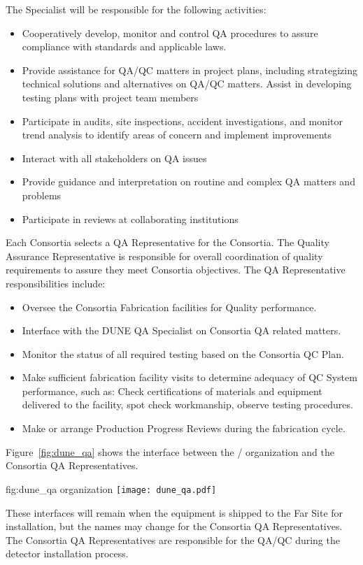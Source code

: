The  Specialist will be responsible for the
following activities:
\begin{itemize}
	\item Cooperatively develop, monitor and control 
          QA procedures to assure compliance with 
          standards and applicable laws.
     \item Provide assistance for QA/QC matters in project plans,
       including strategizing technical solutions and alternatives on
       QA/QC matters.  Assist in developing testing plans with project
       team members
	   \item Participate in audits, site inspections, accident
             investigations, and monitor trend analysis to identify
             areas of concern and implement improvements
	\item Interact with all stakeholders on QA issues
      \item Provide guidance and interpretation on routine and complex
        QA matters and problems
	\item Participate in reviews at collaborating
          institutions
\end{itemize}

Each Consortia selects a QA Representative for the Consortia.  The
Quality Assurance Representative is responsible for overall
coordination of quality requirements to assure they meet Consortia
objectives.  The QA Representative responsibilities include:
\begin{itemize}
  \item Oversee the Consortia Fabrication facilities for Quality
    performance.
  \item Interface with the DUNE QA Specialist on Consortia QA related
    matters.
  \item Monitor the status of all required testing based on the
    Consortia QC Plan.
  \item Make sufficient fabrication facility visits to determine
    adequacy of QC System performance, such as: Check certifications
    of materials and equipment delivered to the facility, spot check
    workmanship, observe testing procedures.
  \item Make or arrange Production Progress Reviews during the
    fabrication cycle.
\end{itemize}

Figure~\ref{fig:dune_qa} shows the interface between the
/  organization and the Consortia QA
Representatives.
\begin{dunefigure}{fig:dune_qa}
  { organization}
  \texttt{[image: dune\_qa.pdf]}
\end{dunefigure}
These interfaces will remain when the equipment is shipped to the Far
Site for installation, but the names may change for the Consortia QA
Representatives.  The Consortia QA Representatives are responsible
for the QA/QC during the detector installation process.



